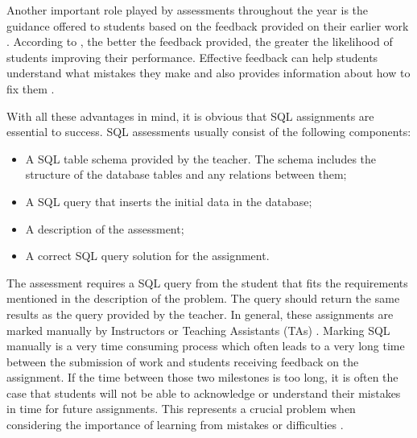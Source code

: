 Another important role played by assessments throughout the year is the guidance offered to students based on the feedback provided on their earlier work \citep{literature:assement}. According to \cite{literature:assement}, the better the feedback provided, the greater the likelihood of students improving their performance. Effective feedback can help students understand what mistakes they make and also provides information about how to fix them \citep{literature:assement}.

With all these advantages in mind, it is obvious that SQL assignments are essential to success. SQL assessments usually consist of the following components:
\begin{itemize}
    \item A SQL table schema provided by the teacher. The schema includes
    the structure of the database tables and any relations between them;
    \item A SQL query that inserts the initial data in the database;
    \item A description of the assessment;
    \item A correct SQL query solution for the
    assignment.
\end{itemize}

The assessment requires a SQL query from the student that fits the requirements mentioned in the description of the problem. The query should return the same results as the query provided by the teacher. In general, these assignments are marked manually by Instructors or Teaching Assistants (TAs) \citep{literature:xdata}. Marking SQL manually is a very time consuming process which often leads to a very long time between the submission of work and students receiving feedback on the assignment. If the time between those two milestones is too long, it is often the case that students will not be able to acknowledge or understand their mistakes in time for future assignments. This represents a crucial problem when considering the importance of learning from mistakes or difficulties \citep{literature:assement}.

